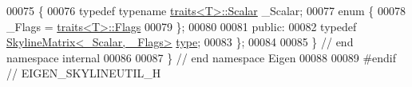 \begin{DoxyCode}
00075 \{
00076     \textcolor{keyword}{typedef} \textcolor{keyword}{typename} \hyperlink{struct_eigen_1_1internal_1_1traits}{traits<T>::Scalar} \_Scalar;
00077     \textcolor{keyword}{enum} \{
00078           \_Flags = \hyperlink{struct_eigen_1_1internal_1_1traits}{traits<T>::Flags}
00079     \};
00080 
00081   \textcolor{keyword}{public}:
00082     \textcolor{keyword}{typedef} \hyperlink{class_eigen_1_1_skyline_matrix}{SkylineMatrix<\_Scalar, \_Flags>} \hyperlink{class_eigen_1_1_skyline_matrix}{type};
00083 \};
00084 
00085 \} \textcolor{comment}{// end namespace internal}
00086 
00087 \} \textcolor{comment}{// end namespace Eigen}
00088 
00089 \textcolor{preprocessor}{#endif // EIGEN\_SKYLINEUTIL\_H}
\end{DoxyCode}
